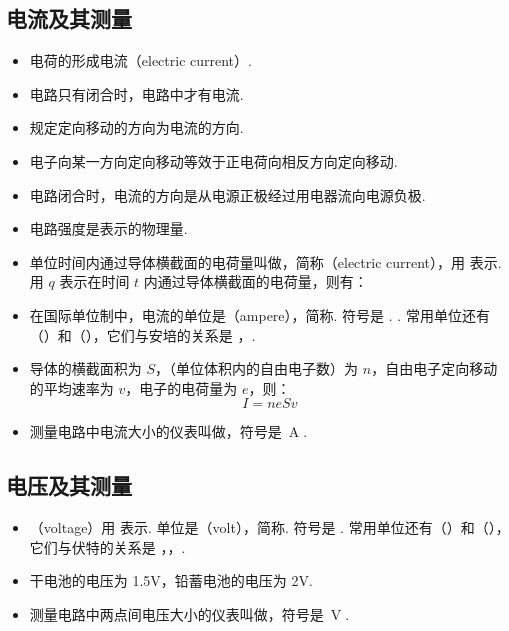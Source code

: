 \subsection{电流及其测量}
\vspace{10pt}
\begin{itemize}
\item 电荷的形成电流（electric current）.
\item 电路只有闭合时，电路中才有电流.
\item 规定定向移动的方向为电流的方向.
\item 电子向某一方向定向移动等效于正电荷向相反方向定向移动.
\item 电路闭合时，电流的方向是从电源正极经过用电器流向电源负极.
\item 电路强度是表示的物理量.
\item 单位时间内通过导体横截面的电荷量叫做，简称（electric current），用  表示. 用 $q$ 表示在时间 $t$ 内通过导体横截面的电荷量，则有：
\item 在国际单位制中，电流的单位是（ampere），简称. 符号是 . . 常用单位还有（）和（），它们与安培的关系是 ，.
\item 导体的横截面积为 $S$，（单位体积内的自由电子数）为 $n$，自由电子定向移动的平均速率为 $v$，电子的电荷量为 $e$，则：
$$
I=neSv
$$
\item 测量电路中电流大小的仪表叫做，符号是~{\Large\textcircled{\small A}}.
\end{itemize}

\subsection{电压及其测量}
\vspace{10pt}
\begin{itemize}
\item {}（voltage）用  表示. 单位是（volt），简称. 符号是 . 常用单位还有（）和（），它们与伏特的关系是 ，，.
\item 干电池的电压为 1.5V，铅蓄电池的电压为 2V.
\item 测量电路中两点间电压大小的仪表叫做，符号是~{\Large\textcircled{\small V}}.
\end{itemize}

